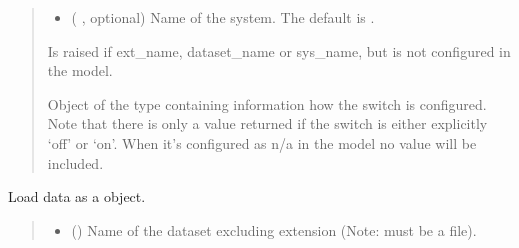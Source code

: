 \documentclass[letterpaper,10pt,english]{sphinxmanual}
\begin{document}
\begin{fulllineitems}
\begin{fulllineitems}
\begin{quote}
\begin{description}
\begin{itemize}
\item {} 
\sphinxAtStartPar
{} ( , optional) \textendash{} Name of the system. The default is .

\end{itemize}

\sphinxAtStartPar
{} \textendash{} Is raised if ext\_name, dataset\_name or sys\_name, but is not configured in the model.

\sphinxAtStartPar
Object of the type {\hyperref[\detokenize{autoapi/euromod/core/index:euromod.core.ExtensionSwitch}]{}} containing information how the switch is configured.
Note that there is only a value returned if the switch is either explicitly ‘off’ or ‘on’.
When it’s configured as n/a in the model no value will be included.

\sphinxAtStartPar
{\hyperref[\detokenize{autoapi/euromod/core/index:euromod.core.ExtensionSwitch}]{}}

\end{description}\end{quote}

\end{fulllineitems}


\begin{fulllineitems}
\label{\detokenize{autoapi/euromod/core/index:euromod.core.Country.load_data}}
\pysigstartsignatures
{}
\pysigstopsignatures
\sphinxAtStartPar
Load data as a  object.
\begin{quote}\begin{description}
\begin{itemize}
\item {} 
\sphinxAtStartPar
{} () \textendash{} Name of the dataset excluding extension (Note: must be a  file).


\end{itemize}
\end{description}
\end{quote}
\end{fulllineitems}
\end{fulllineitems}
\end{document}
